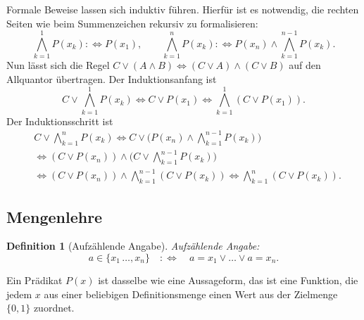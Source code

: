 \documentclass[a4paper,11pt,fleqn,twoside]{scrartcl}
\numberwithin{equation}{section}
\theoremstyle{rmbox}
\newtheorem{Definition}{Definition}
\newcommand{\emdef}[1]{\emph{#1}}
\begin{document}
Formale Beweise lassen sich induktiv führen. Hierfür ist es notwendig,
die rechten Seiten wie beim Summenzeichen rekursiv zu formalisieren:
\begin{equation}
\bigwedge_{k=1}^1 P(x_k) :\Longleftrightarrow P(x_1),\qquad
\bigwedge_{k=1}^n P(x_k) :\Longleftrightarrow P(x_n)\land\bigwedge_{k=1}^{n-1} P(x_k).
\end{equation}
Nun lässt sich die Regel $C\lor (A\land B)\iff (C\lor A)\land(C\lor B)$
auf den Allquantor übertragen. Der Induktionsanfang ist
\begin{equation}
C\lor\bigwedge_{k=1}^1 P(x_k) \iff C\lor P(x_1) \iff \bigwedge_{k=1}^1 (C\lor P(x_1)).
\end{equation}
Der Induktionsschritt ist
\begin{align}
& C\lor\!\bigwedge_{k=1}^n P(x_k)
\iff C\lor\bigg(P(x_n)\land\bigwedge_{k=1}^{n-1} P(x_k)\bigg)\\
&\iff (C\lor P(x_n))\land\bigg(C\lor\!\bigwedge_{k=1}^{n-1} P(x_k)\bigg)\\
&\iff (C\lor P(x_n))\land\bigwedge_{k=1}^{n-1} (C\lor P(x_k))
\iff \bigwedge_{k=1}^{n} (C\lor P(x_k)).
\end{align}
\subsection{Mengenlehre}

\begin{Definition}[Aufzählende Angabe]
\emdef{Aufzählende Angabe}:
\begin{equation}
a\in\{x_1\,\ldots,x_n\} \quad:\Longleftrightarrow\quad
a=x_1\lor\ldots\lor a=x_n.
\end{equation}
\end{Definition}

\noindent
Ein Prädikat $P(x)$ ist dasselbe wie eine Aussageform, das ist eine
Funktion, die jedem $x$ aus einer beliebigen Definitionsmenge
einen Wert aus der Zielmenge $\{0,1\}$ zuordnet.
\end{document}
